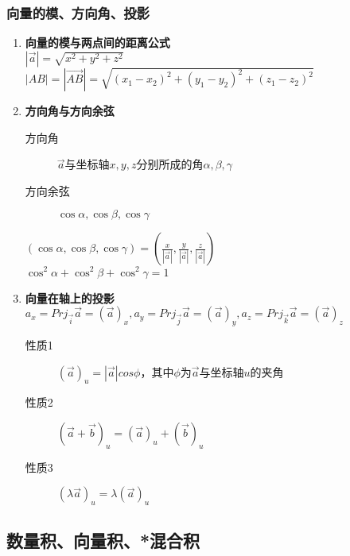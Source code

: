 \documentclass{article} %
\begin{document}
\subsubsection{向量的模、方向角、投影}
\begin{enumerate}
    \item \textbf{向量的模与两点间的距离公式}\\
    $|\overrightarrow{a}|=\sqrt{x^2+y^2+z^2}$\\
    $|AB|=|\overrightarrow{AB}|=\sqrt{(x_1-x_2)^2+(y_1-y_2)^2+(z_1-z_2)^2}$

    \item \textbf{方向角与方向余弦}
    \begin{description}
        \item[方向角]{$\overrightarrow{a}$与坐标轴$x,y,z$分别所成的角$\alpha,\beta,\gamma$}
        \item[方向余弦]{$\cos\alpha,\cos\beta,\cos\gamma$} 
    \end{description}
    $\displaystyle(\cos\alpha,\cos\beta,\cos\gamma)=(\frac{x}{|\overrightarrow{a}|},\frac{y}{|\overrightarrow{a}|},\frac{z}{|\overrightarrow{a}|})$\\
    $\cos^2\alpha+\cos^2\beta+\cos^2\gamma=1$

    \item \textbf{向量在轴上的投影}\\
    $\displaystyle a_x=Prj_{\overrightarrow{i}}\overrightarrow{a}=(\overrightarrow{a})_x,a_y=Prj_{\overrightarrow{j}}\overrightarrow{a}=(\overrightarrow{a})_y,a_z=Prj_{\overrightarrow{k}}\overrightarrow{a}=(\overrightarrow{a})_z$
    \begin{description}
        \item [性质1]{$(\overrightarrow{a})_u=|\overrightarrow{a}|cos\phi$，其中$\phi$为$\overrightarrow{a}$与坐标轴$u$的夹角}
        \item [性质2]{$(\overrightarrow{a}+\overrightarrow{b})_u=(\overrightarrow{a})_u+(\overrightarrow{b})_u$}
        \item [性质3]{$(\lambda\overrightarrow{a})_u=\lambda(\overrightarrow{a})_u$}
    \end{description}
\end{enumerate}

\subsection{数量积、向量积、*混合积}
\end{document}
